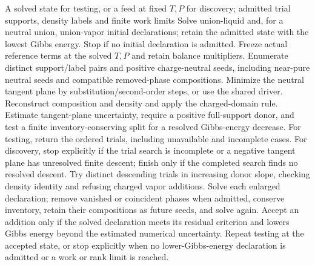 \begin{algorithm}[H]
\caption{Explicit tangent-plane testing and phase discovery}
\label{alg:discovery}
\begin{algorithmic}[1]
\Require A solved state for testing, or a feed at fixed $T,P$ for discovery; admitted trial supports, density labels and finite work limits
\State Solve union-liquid and, for a neutral union, union-vapor initial declarations; retain the admitted state with the lowest Gibbs energy.
\State Stop if no initial declaration is admitted.
\EndIf
\State Freeze actual reference terms at the solved $T,P$ and retain balance multipliers.
\State Enumerate distinct support/label pairs and positive charge-neutral seeds, including near-pure neutral seeds and compatible removed-phase compositions.
\State Minimize the neutral tangent plane by substitution/second-order steps, or use the shared driver.
\State Reconstruct composition and density and apply the charged-domain rule.
\State Estimate tangent-plane uncertainty, require a positive full-support donor, and test a finite inventory-conserving split for a resolved Gibbs-energy decrease.
\EndFor
\State For testing, return the ordered trials, including unavailable and incomplete cases.
\State For discovery, stop explicitly if the trial search is incomplete or a negative tangent plane has unresolved finite descent; finish only if the completed search finds no resolved descent.
\State Try distinct descending trials in increasing donor slope, checking density identity and refusing charged vapor additions.
\State Solve each enlarged declaration; remove vanished or coincident phases when admitted, conserve inventory, retain their compositions as future seeds, and solve again.
\State Accept an addition only if the solved declaration meets its residual criterion and lowers Gibbs energy beyond the estimated numerical uncertainty.
\State Repeat testing at the accepted state, or stop explicitly when no lower-Gibbs-energy declaration is admitted or a work or rank limit is reached.
\end{algorithmic}
\end{algorithm}

